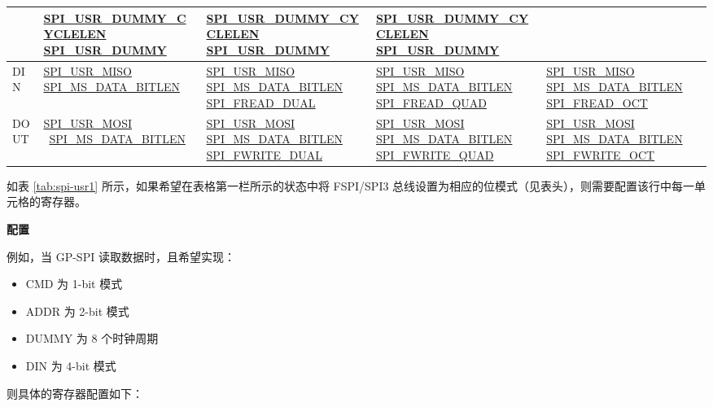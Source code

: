 \documentclass[main\_\_CN.tex]{subfiles}
\begin{document}
\begin{landscape}
\begin{longtable}[c]{ |L{1.3cm}|L{5.2cm}|L{5.2cm}|L{5.2cm}|L{5.2cm}| }
     &\hyperref[fielddesc:SPIUSRDUMMYCYCLELEN]{SPI\_USR\_DUMMY\_CYCLELEN}     \hyperref[fielddesc:SPIUSRDUMMY]{SPI\_USR\_DUMMY} &
     \hyperref[fielddesc:SPIUSRDUMMYCYCLELEN]{SPI\_USR\_DUMMY\_CYCLELEN}     \hyperref[fielddesc:SPIUSRDUMMY]{SPI\_USR\_DUMMY} &\hyperref[fielddesc:SPIUSRDUMMYCYCLELEN]{SPI\_USR\_DUMMY\_CYCLELEN}
      \hyperref[fielddesc:SPIUSRDUMMY]{SPI\_USR\_DUMMY}\\
     \hline
DIN  &\hyperref[fielddesc:SPIUSRMISO]{SPI\_USR\_MISO}
      \hyperref[fielddesc:SPIMSDATABITLEN]{SPI\_MS\_DATA\_BITLEN}
     &\hyperref[fielddesc:SPIUSRMISO]{SPI\_USR\_MISO}
     \hyperref[fielddesc:SPIMSDATABITLEN]{SPI\_MS\_DATA\_BITLEN}
     \hyperref[fielddesc:SPIFREADDUAL]{SPI\_FREAD\_DUAL}
     &\hyperref[fielddesc:SPIUSRMISO]{SPI\_USR\_MISO}
     \hyperref[fielddesc:SPIMSDATABITLEN]{SPI\_MS\_DATA\_BITLEN}
     \hyperref[fielddesc:SPIFREADQUAD]{SPI\_FREAD\_QUAD}&\hyperref[fielddesc:SPIUSRMISO]{SPI\_USR\_MISO}
     \hyperref[fielddesc:SPIMSDATABITLEN]{SPI\_MS\_DATA\_BITLEN}
     \hyperref[fielddesc:SPIFREADOCT]{SPI\_FREAD\_OCT}\\
     \hline
DOUT &\hyperref[fielddesc:SPIUSRMOSI]{SPI\_USR\_MOSI}       \
      \hyperref[fielddesc:SPIMSDATABITLEN]{SPI\_MS\_DATA\_BITLEN}
     &\hyperref[fielddesc:SPIUSRMOSI]{SPI\_USR\_MOSI}
     \hyperref[fielddesc:SPIMSDATABITLEN]{SPI\_MS\_DATA\_BITLEN}       \hyperref[fielddesc:SPIFWRITEDUAL]{SPI\_FWRITE\_DUAL} &
     \hyperref[fielddesc:SPIUSRMOSI]{SPI\_USR\_MOSI}
     \hyperref[fielddesc:SPIMSDATABITLEN]{SPI\_MS\_DATA\_BITLEN}       \hyperref[fielddesc:SPIFWRITEQUAD]{SPI\_FWRITE\_QUAD} & \hyperref[fielddesc:SPIUSRMOSI]{SPI\_USR\_MOSI}
     \hyperref[fielddesc:SPIMSDATABITLEN]{SPI\_MS\_DATA\_BITLEN}       \hyperref[fielddesc:SPIFWRITEOCT]{SPI\_FWRITE\_OCT}\\
     \hline
\end{longtable}
\end{landscape}

如表  \ref{tab:spi-usr1} 所示，如果希望在表格第一栏所示的状态中将 FSPI/SPI3 总线设置为相应的位模式（见表头），则需要配置该行中每一单元格的寄存器。

\textbf{配置}

例如，当 GP-SPI 读取数据时，且希望实现：
\begin{itemize}
    \item CMD 为 1-bit 模式
    \item ADDR 为 2-bit 模式
    \item DUMMY 为 8 个时钟周期
    \item DIN 为 4-bit 模式
\end{itemize}
则具体的寄存器配置如下：
\end{document}
